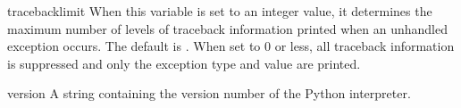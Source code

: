 \begin{datadesc}{tracebacklimit}
When this variable is set to an integer value, it determines the
maximum number of levels of traceback information printed when an
unhandled exception occurs.  The default is .  When set to
0 or less, all traceback information is suppressed and only the
exception type and value are printed.
\end{datadesc}

\begin{datadesc}{version}
A string containing the version number of the Python interpreter.  
\end{datadesc}
